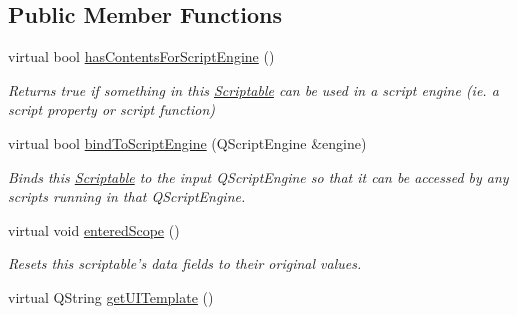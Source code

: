 \subsection*{Public Member Functions}
\begin{DoxyCompactItemize}
\item 
\hypertarget{class_picto_1_1_scriptable_a582fbaab4825738e4ec30c9fc55ced7c}{virtual bool \hyperlink{class_picto_1_1_scriptable_a582fbaab4825738e4ec30c9fc55ced7c}{has\-Contents\-For\-Script\-Engine} ()}\label{class_picto_1_1_scriptable_a582fbaab4825738e4ec30c9fc55ced7c}

\begin{DoxyCompactList}\small\item\em Returns true if something in this \hyperlink{class_picto_1_1_scriptable}{Scriptable} can be used in a script engine (ie. a script property or script function) \end{DoxyCompactList}\item 
\hypertarget{class_picto_1_1_scriptable_adce0998e15121e926dc77624a40a436e}{virtual bool \hyperlink{class_picto_1_1_scriptable_adce0998e15121e926dc77624a40a436e}{bind\-To\-Script\-Engine} (Q\-Script\-Engine \&engine)}\label{class_picto_1_1_scriptable_adce0998e15121e926dc77624a40a436e}

\begin{DoxyCompactList}\small\item\em Binds this \hyperlink{class_picto_1_1_scriptable}{Scriptable} to the input Q\-Script\-Engine so that it can be accessed by any scripts running in that Q\-Script\-Engine. \end{DoxyCompactList}\item 
virtual void \hyperlink{class_picto_1_1_scriptable_ad1945e93d9ebf6cb1f1b8d0a400b73c5}{entered\-Scope} ()
\begin{DoxyCompactList}\small\item\em Resets this scriptable's data fields to their original values. \end{DoxyCompactList}\item 
\hypertarget{class_picto_1_1_scriptable_af6f0991ce62c13a73189629d8f7cba22}{virtual Q\-String \hyperlink{class_picto_1_1_scriptable_af6f0991ce62c13a73189629d8f7cba22}{get\-U\-I\-Template} ()}\label{class_picto_1_1_scriptable_af6f0991ce62c13a73189629d8f7cba22}


\end{DoxyCompactItemize}
